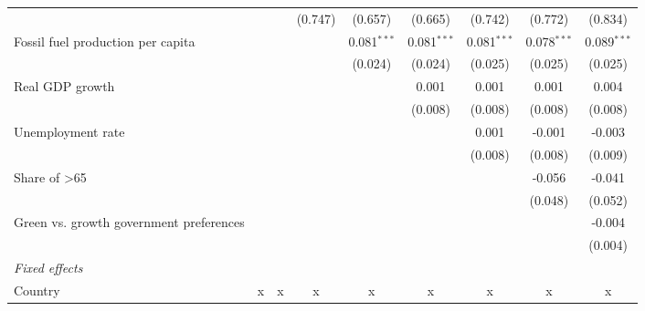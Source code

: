 \begin{table}[htbp]
\begin{tabular}{lcccccccc}
                                                                &                &         & (0.747) & (0.657)       & (0.665)       & (0.742)       & (0.772)       & (0.834)\\   
      Fossil fuel production per capita                         &                &         &         & 0.081$^{***}$ & 0.081$^{***}$ & 0.081$^{***}$ & 0.078$^{***}$ & 0.089$^{***}$\\   
                                                                &                &         &         & (0.024)       & (0.024)       & (0.025)       & (0.025)       & (0.025)\\   
      Real GDP growth                                           &                &         &         &               & 0.001         & 0.001         & 0.001         & 0.004\\   
                                                                &                &         &         &               & (0.008)       & (0.008)       & (0.008)       & (0.008)\\   
      Unemployment rate                                         &                &         &         &               &               & 0.001         & -0.001        & -0.003\\   
                                                                &                &         &         &               &               & (0.008)       & (0.008)       & (0.009)\\   
      Share of >65                                              &                &         &         &               &               &               & -0.056        & -0.041\\   
                                                                &                &         &         &               &               &               & (0.048)       & (0.052)\\   
      Green vs. growth government preferences                   &                &         &         &               &               &               &               & -0.004\\   
                                                                &                &         &         &               &               &               &               & (0.004)\\   
      \emph{Fixed effects}\\
      Country                                                   & x              & x       & x       & x             & x             & x             & x             & x\\  

\end{tabular}
\end{table}
